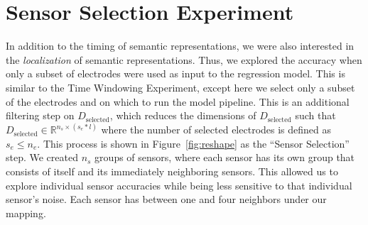 \section{Sensor Selection Experiment}
In addition to the timing of semantic representations, we were also interested in the \emph{localization} of semantic representations. Thus, we explored the \tvt accuracy when only a subset of electrodes were used as input to the regression model. This is similar to the Time Windowing Experiment, except here we select only a subset of the electrodes and on which to run the model pipeline. This is an additional filtering step on $D_{\text{selected}}$, which reduces the dimensions of $D_\text{selected}$ such that $D_\text{selected} \in \mathbb{R}^{n_s \times (s_e * l)}$ where the number of selected electrodes is defined as $s_e \leq n_e$. This process is shown in Figure~\ref{fig:reshape} as the ``Sensor Selection'' step. We created $n_s$ groups of sensors, where each sensor has its own group that consists of itself and its immediately neighboring sensors. This allowed us to explore individual sensor accuracies while being less sensitive to that individual sensor's noise. Each sensor has between one and four neighbors under our mapping.
